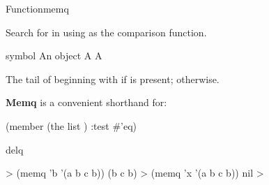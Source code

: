 \documentclass[10pt,twoside,english,pdftex]{article}
\begin{document}

\begin{functiondoc}{Function}{memq}{
    \returns{} } 
%
  
\fnsyntax

\fnpurpose Search for  in  using  as the
comparison function.

\fnpackage {}

\fnmodule {}

\fnargs
\begin{args}{symbol}
\arg[item] An object
\arg[list] A 
\arg[tail] A 
\end{args}

\fnreturns The tail of  beginning with  if
 is present; \nil{} otherwise.

\fndescription \textbf{Memq} is a convenient shorthand for:
%
\W\supp
\begin{example}
  (member  (the list ) :test #'eq)
\end{example}

\begin{alsos}{delq}
\also[delq]
\end{alsos}

\fnexamples
%
\W\supp
\begin{example}
  > (memq 'b '(a b c b))
  (b c b)
  > (memq 'x '(a b c b))
  nil
  >
\end{example}

\end{functiondoc}

\end{document}
